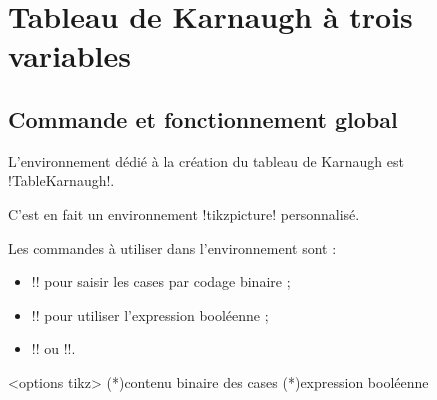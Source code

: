 \documentclass[french,a4paper,11pt]{article}
\begin{document}
{{\pagebreak

\section{Tableau de Karnaugh à trois variables}

\subsection{Commande et fonctionnement global}

\begin{cautionblock}
L'environnement dédié à la création du tableau de Karnaugh est \motcletex!TableKarnaugh!.

C'est en fait un environnement \motcletex!tikzpicture! personnalisé.

\smallskip

Les commandes à utiliser dans l'environnement sont :

\begin{itemize}
	\item \motcletex!\KarnaughCasesResult! pour saisir les cases par codage binaire ;
	\item \motcletex!\KarnaughCasesAuto! pour utiliser l'expression booléenne ;
	\item \motcletex!\KarnaughBlocRegroup! ou \motcletex!\KarnaughBlocRegroupAuto!.
\end{itemize}
\vspace*{-\baselineskip}\leavevmode
\end{cautionblock}

\begin{DemoCode}
\begin{TableKarnaugh}[clés]<options tikz>
	\KarnaughCasesResult(*){contenu binaire des cases} %
	\KarnaughCasesAuto(*){expression booléenne} %
\end{TableKarnaugh}
\end{DemoCode}
%

\begin{DemoCode}[]
\begin{TableKarnaugh}[Aide]
\end{TableKarnaugh}
\hspace{0.25cm}
\begin{TableKarnaugh}[Variables=u/v/w]
\end{TableKarnaugh}
\hspace{0.25cm}
\begin{TableKarnaugh}[Variables=u/v/w,Swap]
\end{TableKarnaugh}


\end{DemoCode}}}
\end{document}
